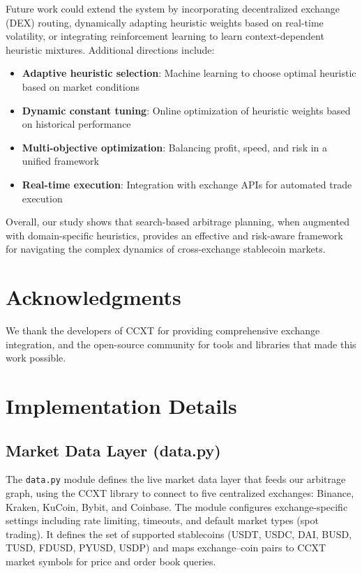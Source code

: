 \documentclass[11pt]{article}
\begin{document}
Future work could extend the system by incorporating decentralized exchange (DEX) routing, dynamically adapting heuristic weights based on real-time volatility, or integrating reinforcement learning to learn context-dependent heuristic mixtures. Additional directions include:
\begin{itemize}
\item \textbf{Adaptive heuristic selection}: Machine learning to choose optimal heuristic based on market conditions
\item \textbf{Dynamic constant tuning}: Online optimization of heuristic weights based on historical performance
\item \textbf{Multi-objective optimization}: Balancing profit, speed, and risk in a unified framework
\item \textbf{Real-time execution}: Integration with exchange APIs for automated trade execution
\end{itemize}

Overall, our study shows that search-based arbitrage planning, when augmented with domain-specific heuristics, provides an effective and risk-aware framework for navigating the complex dynamics of cross-exchange stablecoin markets.

\section*{Acknowledgments}

We thank the developers of CCXT for providing comprehensive exchange integration, and the open-source community for tools and libraries that made this work possible.

\appendix

\section{Implementation Details}

\subsection{Market Data Layer (data.py)}

The \texttt{data.py} module defines the live market data layer that feeds our arbitrage graph, using the CCXT library to connect to five centralized exchanges: Binance, Kraken, KuCoin, Bybit, and Coinbase. The module configures exchange-specific settings including rate limiting, timeouts, and default market types (spot trading). It defines the set of supported stablecoins (USDT, USDC, DAI, BUSD, TUSD, FDUSD, PYUSD, USDP) and maps exchange--coin pairs to CCXT market symbols for price and order book queries.
\end{document}
